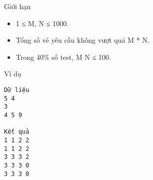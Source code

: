 Giới hạn
\begin{itemize}
	\item     1 ≤ M, N ≤ 1000.   
	\item     Tổng số vé yêu cầu không vượt quá M * N.   
	\item     Trong 40\% số test, M N ≤ 100.   
\end{itemize}
Ví dụ
\begin{verbatim}
Dữ liệu
5 4
3
4 5 9

Kết quả
1 1 2 2
1 1 2 2
3 3 3 2
3 3 3 0
3 3 3 0
\end{verbatim}